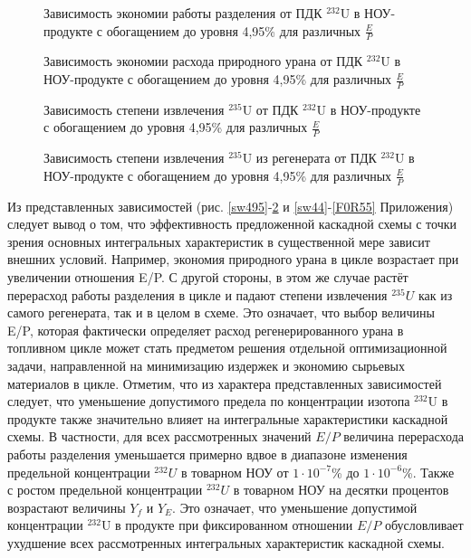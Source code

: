 \begin{figure}[ht]
    \centering
    \begin{minipage}{.5\textwidth}
      \centering
      
\caption{{Зависимость экономии работы разделения от ПДК $^{232}$U в НОУ-продукте с обогащением до уровня 4,95\% для различных $\frac{E}{P}${\label{sw495}}}}
    \end{minipage}%
    \begin{minipage}{.5\textwidth}
      \centering
      
    \caption{{Зависимость экономии расхода природного урана от ПДК $^{232}$U в НОУ-продукте с обогащением до уровня 4,95\% для различных $\frac{E}{P}${\label{F0R495}}}}
\end{minipage}
\end{figure}

\begin{figure}[ht]
    \centering
    \begin{minipage}{.5\textwidth}
      \centering
      
      \caption{{Зависимость степени извлечения $^{235}$U от ПДК $^{232}$U в НОУ-продукте с обогащением до уровня 4,95\% для различных $\frac{E}{P}${\label{ex495}}}}
    \end{minipage}%
    \begin{minipage}{.5\textwidth}
      \centering
      
      \caption{{Зависимость степени извлечения $^{235}$U из регенерата от ПДК $^{232}$U в НОУ-продукте с обогащением до уровня 4,95\% для различных $\frac{E}{P}${\label{exR495}}}}
\end{minipage}
\end{figure}

Из представленных зависимостей (рис. \ref{sw495}-\ref{exR495} и \ref{sw44}-\ref{F0R55} Приложения) следует вывод о том, что эффективность предложенной каскадной схемы с точки зрения основных интегральных характеристик в существенной мере зависит внешних условий. Например, экономия природного урана в цикле возрастает при увеличении отношения E/P. С другой стороны, в этом же случае растёт перерасход работы разделения в цикле и падают степени извлечения $^{235}U$ как из самого регенерата, так и в целом в схеме. Это означает, что выбор величины E/P, которая фактически определяет расход регенерированного урана в топливном цикле может стать предметом решения отдельной оптимизационной задачи, направленной на минимизацию издержек и экономию сырьевых материалов в цикле. 
Отметим, что из характера представленных зависимостей следует, что уменьшение допустимого предела по концентрации изотопа $^{232}$U в продукте также значительно влияет на интегральные характеристики каскадной схемы. В частности, для всех рассмотренных значений $E/P$ величина перерасхода работы разделения уменьшается примерно вдвое в диапазоне изменения предельной концентрации $^{232}U$ в товарном НОУ от $1\cdot10^{-7}$\% до $1\cdot10^{-6}$\%. Также с ростом предельной концентрации $^{232}U$ в товарном НОУ на десятки процентов возрастают величины $Y_f$ и $Y_{E}$. Это означает, что уменьшение допустимой концентрации $^{232}$U в продукте при фиксированном отношении $E/P$ обусловливает ухудшение всех рассмотренных интегральных характеристик каскадной схемы. 

